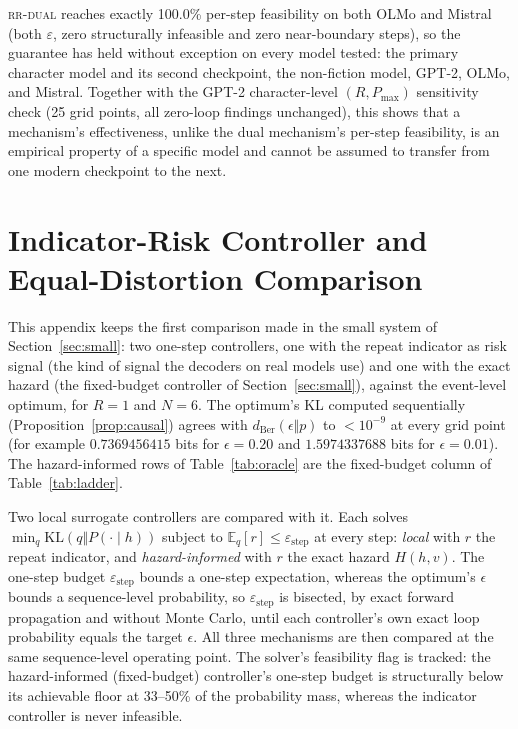\documentclass[make,article,submit,pdftex]{Definitions/mdpi}
\providecommand{\KL}{}\renewcommand{\KL}{\mathrm{KL}}
\providecommand{\E}{}\renewcommand{\E}{\mathbb{E}}
\begin{document}
\textsc{rr-dual} reaches exactly 100.0\% per-step feasibility on both OLMo and Mistral (both $\varepsilon$, zero structurally infeasible and zero near-boundary steps), so the guarantee has held without exception on every model tested: the primary character model and its second checkpoint, the non-fiction model, GPT-2, OLMo, and Mistral. Together with the GPT-2 character-level $(R,P_{\max})$ sensitivity check (25 grid points, all zero-loop findings unchanged), this shows that a mechanism's effectiveness, unlike the dual mechanism's per-step feasibility, is an empirical property of a specific model and cannot be assumed to transfer from one modern checkpoint to the next.



\section{Indicator-Risk Controller and Equal-Distortion Comparison}\label{app:indicator}
This appendix keeps the first comparison made in the small system of Section~\ref{sec:small}: two one-step controllers, one with the repeat indicator as risk signal (the kind of signal the decoders on real models use) and one with the exact hazard (the fixed-budget controller of Section~\ref{sec:small}), against the event-level optimum, for $R=1$ and $N=6$. The optimum's KL computed sequentially (Proposition~\ref{prop:causal}) agrees with $d_{\mathrm{Ber}}(\epsilon\Vert p)$ to $<10^{-9}$ at every grid point (for example $0.7369456415$ bits for $\epsilon{=}0.20$ and $1.5974337688$ bits for $\epsilon{=}0.01$). The hazard-informed rows of Table~\ref{tab:oracle} are the fixed-budget column of Table~\ref{tab:ladder}.

Two local surrogate controllers are compared with it. Each solves $\min_q\KL(q\Vert P(\cdot\mid h))$ subject to $\E_q[r]\le\varepsilon_{\text{step}}$ at every step: \emph{local} with $r$ the repeat indicator, and \emph{hazard-informed} with $r$ the exact hazard $H(h,v)$. The one-step budget $\varepsilon_{\text{step}}$ bounds a one-step expectation, whereas the optimum's $\epsilon$ bounds a sequence-level probability, so $\varepsilon_{\text{step}}$ is bisected, by exact forward propagation and without Monte Carlo, until each controller's own exact loop probability equals the target $\epsilon$. All three mechanisms are then compared at the same sequence-level operating point. The solver's feasibility flag is tracked: the hazard-informed (fixed-budget) controller's one-step budget is structurally below its achievable floor at 33--50\% of the probability mass, whereas the indicator controller is never infeasible.
\end{document}
